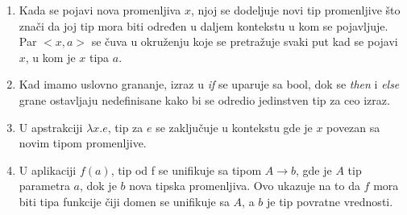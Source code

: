 \begin{enumerate}
	\item Kada se pojavi nova promenljiva $x$, njoj se dodeljuje novi tip promenljive što znači da joj tip mora biti određen u daljem kontekstu u kom se pojavljuje. Par $<x, a>$ se čuva u okruženju koje se pretražuje svaki put kad se pojavi $x$, u kom je $x$ tipa $a$.
	
	\item Kad imamo uslovno grananje, izraz u \textit{if} se uparuje sa bool, dok se \textit{then} i \textit{else} grane ostavljaju nedefinisane kako bi se odredio jedinstven tip za ceo izraz.
	
	\item U apstrakciji $\lambda x.e$, tip za $e$ se zaključuje u kontekstu gde je $x$ povezan sa novim tipom promenljive.
	
	\item U aplikaciji $f(a)$, tip od f se unifikuje sa tipom $A \longrightarrow b$, gde je $A$ tip parametra $a$, dok je $b$ nova tipska promenljiva. Ovo ukazuje na to da $f$ mora biti tipa funkcije čiji domen se unifikuje sa $A$, a $b$ je tip povratne vrednosti.
\end{enumerate}



